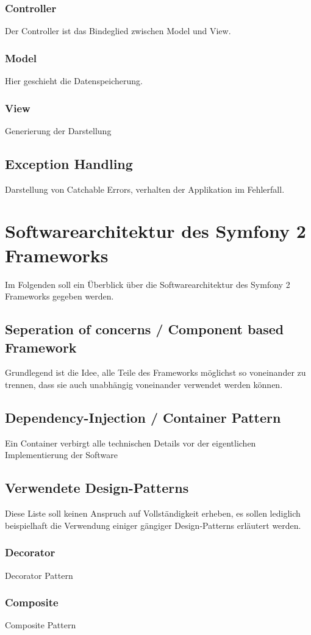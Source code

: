 \documentclass[12pt]{report}
\begin{document}
\subsection{Controller}
Der Controller ist das Bindeglied zwischen Model und View.
\subsection{Model}
Hier geschieht die Datenspeicherung.
\subsection{View}
Generierung der Darstellung
\section{Exception Handling}
Darstellung von Catchable Errors, verhalten der Applikation im Fehlerfall.


\chapter{Softwarearchitektur des Symfony 2 Frameworks}
\label{sec:symfony}
Im Folgenden soll ein Überblick über die Softwarearchitektur des Symfony 2 Frameworks gegeben werden.
\section{Seperation of concerns / Component based Framework}
Grundlegend ist die Idee, alle Teile des Frameworks möglichst so voneinander zu trennen, dass sie auch unabhängig voneinander verwendet werden können.
\section{Dependency-Injection / Container Pattern}
Ein Container verbirgt alle technischen Details vor der eigentlichen Implementierung der Software
\section{Verwendete Design-Patterns}
Diese Liste soll keinen Anspruch auf Vollständigkeit erheben, es sollen lediglich beispielhaft die Verwendung einiger gängiger Design-Patterns erläutert werden.
\subsection{Decorator}
Decorator Pattern
\subsection{Composite}
Composite Pattern
\end{document}
